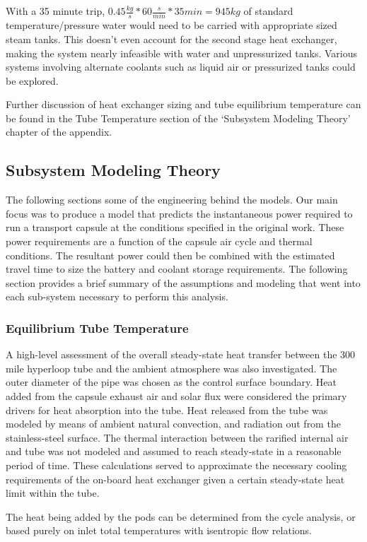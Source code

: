 \documentclass[heading.tex]{subfiles}
\begin{document}
With a 35 minute trip, $0.45 \frac{kg}{s} * 60 \frac{s}{min} * 35min = 945 kg$ of standard temperature/pressure water would need to be carried with appropriate
sized steam tanks. This doesn't even account for the second stage heat exchanger, making the system nearly infeasible with water and
unpressurized tanks. Various systems involving alternate coolants such as liquid air or pressurized tanks could be explored.

Further discussion of heat exchanger sizing and tube equilibrium temperature can be found in the Tube Temperature section of the
‘Subsystem Modeling Theory’ chapter of the appendix.

\subsection{Subsystem Modeling Theory}

The following sections some of the engineering behind the models. Our main focus was to produce a model that predicts the instantaneous
power required to run a transport capsule at the conditions specified in the original work. These power requirements are a function of the
capsule air cycle and thermal conditions. The resultant power could then be combined with the estimated travel time to size the battery
and coolant storage requirements. The following section provides a brief summary of the assumptions and modeling that went into each
sub-system necessary to perform this analysis.


\subsubsection{Equilibrium Tube Temperature}
A high-level assessment of the overall steady-state heat transfer between the 300 mile hyperloop tube and the ambient atmosphere was
also investigated. The outer diameter of the pipe was chosen as the control surface boundary. Heat added from the capsule exhaust air and
solar flux were considered the primary drivers for heat absorption into the tube. Heat released from the tube was modeled by means of
ambient natural convection, and radiation out from the stainless-steel surface. The thermal interaction between the rarified internal air and
tube was not modeled and assumed to reach steady-state in a reasonable period of time. These calculations served to approximate the
necessary cooling requirements of the on-board heat exchanger given a certain steady-state heat limit within the tube.

The heat being added by the pods can be determined from the cycle analysis, or based purely on inlet total temperatures with isentropic
flow relations.
\end{document}
